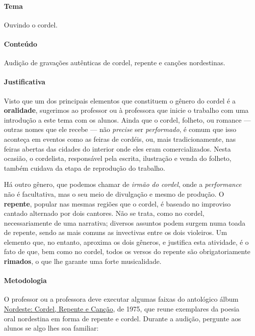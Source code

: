 \documentclass[11pt]{extarticle}
\begin{document}
\paragraph{Tema} Ouvindo o cordel.

\paragraph{Conteúdo} Audição de gravações autênticas de cordel, repente e canções
nordestinas.

\paragraph{Justificativa} Visto que um dos principais elementos que constituem o gênero do cordel é a 
\textbf{oralidade}, sugerimos ao professor ou à professora que inicie o 
trabalho com uma introdução a este tema com os alunos. 
Ainda que o cordel, folheto, ou romance --- outras nomes que ele recebe --- 
não \textit{precise} ser \textit{performado}, é comum que isso aconteça
em eventos como as feiras de cordéis, ou, mais tradicionamente, 
nas feiras abertas das cidades do interior onde eles eram comercializados.
Nesta ocasião, o cordelista, responsável pela escrita, ilustração e venda
do folheto, também cuidava da etapa de reprodução do trabalho.

Há outro gênero, que podemos chamar de \textit{irmão do cordel},
onde a \textit{performance} não é facultativa, mas o seu meio de 
divulgação e mesmo de produção. 
O \textbf{repente}, popular nas mesmas regiões que o cordel, é 
baseado no improviso cantado alternado por dois cantores. 
Não se trata, como no cordel, necessariamente de uma narrativa;
diversos assuntos podem surgem numa toada de repente, sendo as mais comuns
as invectivas entre os dois violeiros. 
Um elemento que, no entanto, aproxima os dois gêneros, e justifica esta atividade,
é o fato de que, bem como no cordel, todos os versos do repente são
obrigatoriamente \textbf{rimados}, o que lhe garante uma forte musicalidade. 

\paragraph{Metodologia} O professor ou a professora deve executar algumas faixas 
do antológico álbum \href{https://www.youtube.com/watch?v=wS6jzcZcc6U}{Nordeste: Cordel, 
Repente e Canção}, de 1975, que
reune exemplares da poesia oral nordestina em forma de repente e cordel. 
Durante a audição, pergunte aos alunos se algo lhes soa familiar:
\end{document}
